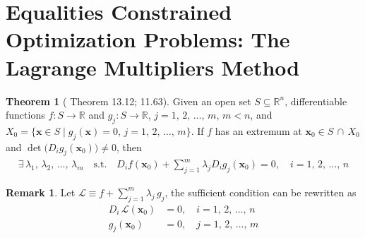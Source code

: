 \documentclass[10pt]{extarticle}
\newcommand{\ds}{\displaystyle}
\theoremstyle{definition}
\newtheorem*{thm}{Theorem}
\newtheorem*{rmk}{Remark}
\newcommand{\vx}{\mathbf{x}}
\begin{document}
\newpage

\section*{Equalities Constrained Optimization Problems: The Lagrange Multipliers Method}


\begin{thm}[\citet{apostol_adv} Theorem 13.12; \citet{wade} 11.63]
  Given an open set $S\subseteq\mathbb{R}^n$, differentiable functions $f:S\to\mathbb{R}$ and $g_j:S\to\mathbb{R}$, $j=1,\,2,\,\ldots,\,m$, $m < n$, and $\ds X_0 = \big\{\vx\in S\;|\;g_j(\vx) = 0,\,j=1,\,2,\,\ldots,\,m\big\}$. If $f$ has an extremum at $\ds\vx_0\in S\,\cap\,X_0$ and $\det\big(D_i g_j(\vx_0)\big)\ne 0$, then
  \begin{align*}
    \exists\,\lambda_1,\,\lambda_2,\,\ldots,\,\lambda_m\quad\text{s.t.}\quad D_i f(\vx_0) + \sum_{j = 1}^m\lambda_j D_i g_j(\vx_0) = 0,\quad\ds i = 1,\,2,\,\ldots,\,n
  \end{align*}
\end{thm}
\begin{rmk}
  Let $\ds\mathcal{L}\equiv f + \sum_{j = 1}^m \lambda_j\,g_j$, the sufficient condition can be rewritten as
  \begin{align*}
    D_i\,\mathcal{L}(\vx_0) &= 0,\quad i = 1,\,2,\,\ldots,\,n \\
    g_j(\vx_0) &= 0,\quad j=1,\,2,\,\ldots,\,m
  \end{align*}
\end{rmk}
\end{document}
